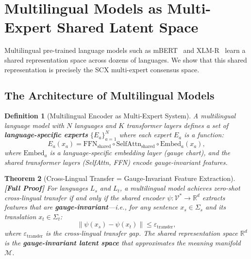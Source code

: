 \documentclass[12pt,a4paper]{article}
\newtheorem{theorem}{Theorem}[section]
\newtheorem{definition}[theorem]{Definition}
\theoremstyle{remark}
\newcommand{\R}{\mathbb{R}}
\newcommand{\M}{\mathcal{M}}
\newcommand{\Vocab}{\mathcal{V}}
\newcommand{\SCX}{\textsf{SCX}}
\newcommand{\rigorFull}{\textbf{[Full Proof]}}
\begin{document}
\section{Multilingual Models as Multi-Expert Shared Latent Space}
\label{sec:multilingual}

Multilingual pre-trained language models such as mBERT~\cite{devlin2019bert}
and XLM-R~\cite{conneau2020unsupervised} learn a shared representation
space across dozens of languages. We show that this shared representation
is precisely the \SCX{} multi-expert consensus space.

\subsection{The Architecture of Multilingual Models}

\begin{definition}[Multilingual Encoder as Multi-Expert System]
\label{def:multilingual_encoder}
A multilingual language model with $N$ languages and $K$ transformer
layers defines a set of \textbf{language-specific experts}
$\{E_a\}_{a=1}^N$ where each expert $E_a$ is a function:
\begin{equation}
  E_a(x_a) = \text{FFN}_{\text{shared}} \circ \text{SelfAttn}_{\text{shared}} \circ \text{Embed}_a(x_a),
\end{equation}
where $\text{Embed}_a$ is a language-specific embedding layer (gauge
chart), and the shared transformer layers (SelfAttn, FFN) encode
gauge-invariant features.
\end{definition}

\begin{theorem}[Cross-Lingual Transfer = Gauge-Invariant Feature Extraction]
\label{thm:crosslingual_transfer}
\rigorFull
For languages $L_s$ and $L_t$, a multilingual model achieves
zero-shot cross-lingual transfer if and only if the shared encoder
$\psi: \Vocab^* \to \R^d$ extracts features that are
\textbf{gauge-invariant}---i.e., for any sentence $x_s \in \Sigma_s$
and its translation $x_t \in \Sigma_t$:
\begin{equation}
  \label{eq:crosslingual_invariant}
  \|\psi(x_s) - \psi(x_t)\| \leq \varepsilon_{\text{transfer}},
\end{equation}
where $\varepsilon_{\text{transfer}}$ is the cross-lingual transfer
gap. The shared representation space $\R^d$ is the \textbf{gauge-invariant
latent space} that approximates the meaning manifold $\M$.
\end{theorem}
\end{document}
